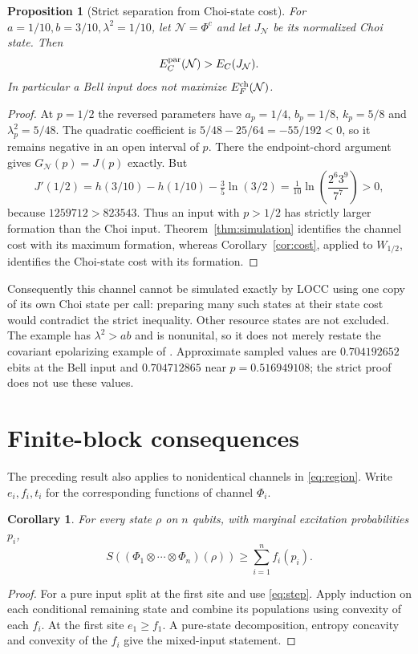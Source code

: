 \documentclass[11pt]{article}
\newtheorem{proposition}[theorem]{Proposition}
\newtheorem{corollary}[theorem]{Corollary}
\begin{document}
\begin{proposition}[Strict separation from Choi-state cost]\label{prop:choigap}
For $a=1/10,b=3/10,\lambda^2=1/10$, let $\mathcal N=\Phi^c$ and let
$J_{\mathcal N}$ be its normalized Choi state. Then
\[
 E_C^{\rm par}(\mathcal N)>E_C(J_{\mathcal N}).
\]
In particular a Bell input does not maximize $E_F^{\rm ch}(\mathcal N)$.
\end{proposition}
\begin{proof}
At $p=1/2$ the reversed parameters have $a_p=1/4$, $b_p=1/8$,
$k_p=5/8$ and $\lambda_p^2=5/48$. The quadratic coefficient is
$5/48-25/64=-55/192<0$, so it remains negative in an open interval of $p$.
There the endpoint-chord argument gives $G_{\mathcal N}(p)=J(p)$ exactly.
But
\[
 J'(1/2)=h(3/10)-h(1/10)-\tfrac35\ln(3/2)
       =\tfrac1{10}\ln\left(\frac{2^6 3^9}{7^7}\right)>0,
\]
because $1259712>823543$. Thus an input with $p>1/2$ has strictly larger
formation than the Choi input. Theorem~\ref{thm:simulation} identifies the
channel cost with its maximum formation, whereas Corollary~\ref{cor:cost},
applied to $W_{1/2}$, identifies the Choi-state cost with its formation.
\end{proof}
Consequently this channel cannot be simulated exactly by LOCC using one
copy of its own Choi state per call: preparing many such states at their
state cost would contradict the strict inequality. Other resource states
are not excluded. The example has $\lambda^2>ab$ and is nonunital, so it
does not merely restate the covariant epolarizing example of \cite{wilde}.
Approximate sampled values are $0.704192652$ ebits at the Bell input and
$0.704712865$ near $p=0.516949108$; the strict proof does not use these values.

\section{Finite-block consequences}
The preceding result also applies to nonidentical channels in \eqref{eq:region}. Write $e_i,f_i,t_i$ for the corresponding functions of channel $\Phi_i$.

\begin{corollary}\label{cor:multi}
For every state $\rho$ on $n$ qubits, with marginal excitation probabilities $p_i$,
\[
 S((\Phi_1\otimes\cdots\otimes\Phi_n)(\rho))
 \ge \sum_{i=1}^n f_i(p_i).
\]
\end{corollary}
\begin{proof}
For a pure input split at the first site and use \eqref{eq:step}. Apply induction on each conditional remaining state and combine its populations using convexity of each $f_i$. At the first site $e_1\ge f_1$. A pure-state decomposition, entropy concavity and convexity of the $f_i$ give the mixed-input statement.
\end{proof}
\end{document}
